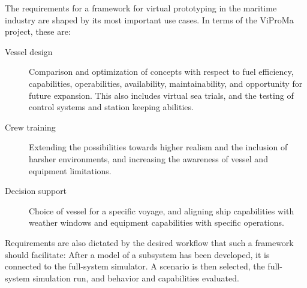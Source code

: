 \documentclass[prb,aps,showpacs,floatfix,twocolumn,10pt]{revtex4-1}
\theoremstyle{plain}
\theoremstyle{remark}
\begin{document}
The requirements for a framework for virtual prototyping in the maritime industry are shaped by its most important use cases.
In terms of the ViProMa project, these are:
\begin{description}
	\item [Vessel design]
		Comparison and optimization of concepts with respect to fuel efficiency, capabilities, operabilities, availability, maintainability, and opportunity for future expansion.
		This also includes virtual sea trials, and the testing of control systems and station keeping abilities.
	\item [Crew training]
		Extending the possibilities towards higher realism and the inclusion of harsher environments, and increasing the awareness of vessel and equipment limitations.
	\item [Decision support]
		Choice of vessel for a specific voyage, and aligning ship capabilities with weather windows and equipment capabilities with specific operations.
\end{description}
Requirements are also dictated by the desired workflow that such a framework should facilitate:
After a model of a subsystem has been developed, it is connected to the full-system simulator.
A scenario is then selected, the full-system simulation run, and behavior and capabilities evaluated.
\end{document}
